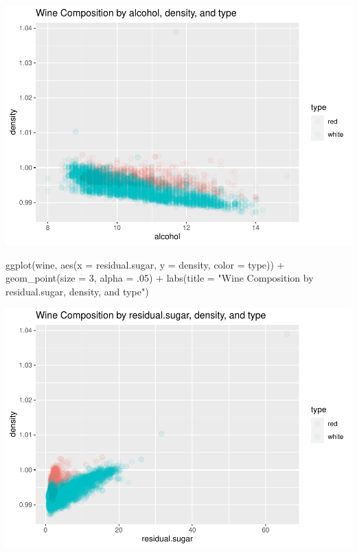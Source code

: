\documentclass[
]{book}
\newenvironment{Shaded}{\begin{snugshade}}{\end{snugshade}}
\newcommand{\AttributeTok}[1]{\textcolor[rgb]{0.77,0.63,0.00}{#1}}
\newcommand{\DecValTok}[1]{\textcolor[rgb]{0.00,0.00,0.81}{#1}}
\newcommand{\FunctionTok}[1]{\textcolor[rgb]{0.00,0.00,0.00}{#1}}
\newcommand{\NormalTok}[1]{#1}
\newcommand{\SpecialCharTok}[1]{\textcolor[rgb]{0.00,0.00,0.00}{#1}}
\newcommand{\StringTok}[1]{\textcolor[rgb]{0.31,0.60,0.02}{#1}}
\begin{document}
\includegraphics{FinalProject-Bright-Santoro_files/figure-latex/unnamed-chunk-8-1.pdf}

\begin{Shaded}
\begin{Highlighting}[]
\FunctionTok{ggplot}\NormalTok{(wine, }
       \FunctionTok{aes}\NormalTok{(}\AttributeTok{x =}\NormalTok{ residual.sugar, }
           \AttributeTok{y =}\NormalTok{ density, }
           \AttributeTok{color =}\NormalTok{ type)) }\SpecialCharTok{+}
  \FunctionTok{geom\_point}\NormalTok{(}\AttributeTok{size =} \DecValTok{3}\NormalTok{, }
             \AttributeTok{alpha =}\NormalTok{ .}\DecValTok{05}\NormalTok{) }\SpecialCharTok{+}
  \FunctionTok{labs}\NormalTok{(}\AttributeTok{title =} \StringTok{"Wine Composition by residual.sugar, density, and type"}\NormalTok{)}
\end{Highlighting}
\end{Shaded}

\includegraphics{FinalProject-Bright-Santoro_files/figure-latex/unnamed-chunk-9-1.pdf}
\end{document}
